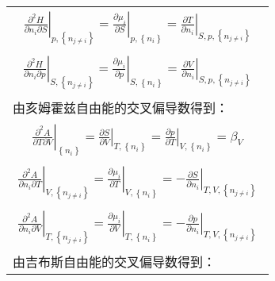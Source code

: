 \documentclass[main.tex]{subfiles}
\begin{document}
\begin{longtable}{m{}}
    \begin{align}\left.\frac{\partial ^2H}{\partial n_i\partial S}\right|_{p,\left\{n_{j\neq i}\right\}}  =\left.\frac{\partial \mu_i}{\partial S}\right|_{p,\left\{n_i\right\}}=\left.\frac{\partial T}{\partial n_i}\right|_{S,p,\left\{n_{j\neq i}\right\}}\label{eq:I.1_Maxwell_HnS}\end{align}  \\[-8ex]
    \begin{align}\left.\frac{\partial ^2H}{\partial n_i\partial p}\right|_{S,\left\{n_{j\neq i}\right\}}  =\left.\frac{\partial \mu_i}{\partial p}\right|_{S,\left\{n_i\right\}}=\left.\frac{\partial V}{\partial n_i}\right|_{S,p,\left\{n_{j\neq i}\right\}}\label{eq:I.1_Maxwell_Hnp}\end{align}  \\
    由亥姆霍兹自由能的交叉偏导数得到：                                                                                                                                                                                                                                                                                \\ [-4ex]
    \begin{align}
        \left.\frac{\partial^2 A}{\partial T\partial V}\right|_{\left\{n_i\right\}}              =\left.\frac{\partial S}{\partial V}\right|_{T,\left\{n_i\right\}}=\left.\frac{\partial p}{\partial T}\right|_{V,\left\{n_i\right\}}=\beta_V\label{eq:I.1_Maxwell_ATV}\end{align}                       \\[-8ex]
    \begin{align}\left.\frac{\partial ^2A}{\partial n_i\partial T}\right|_{V,\left\{n_{j\neq i}\right\}}  =\left.\frac{\partial \mu_i}{\partial T}\right|_{V,\left\{n_i\right\}}=-\left.\frac{\partial S}{\partial n_i}\right|_{T,V,\left\{n_{j\neq i}\right\}}\label{eq:I.1_Maxwell_AnT}\end{align} \\[-8ex]
    \begin{align}\left.\frac{\partial ^2A}{\partial n_i\partial V}\right|_{T,\left\{n_{j\neq i}\right\}}  =\left.\frac{\partial \mu_i}{\partial V}\right|_{T,\left\{n_i\right\}}=-\left.\frac{\partial p}{\partial n_i}\right|_{T,V,\left\{n_{j\neq i}\right\}}\label{eq:I.1_Maxwell_AnV}\end{align} \\
    由吉布斯自由能的交叉偏导数得到：                                                                                                                                                                                                                                                                                 \\ [-4ex]

\end{longtable}
\end{document}
